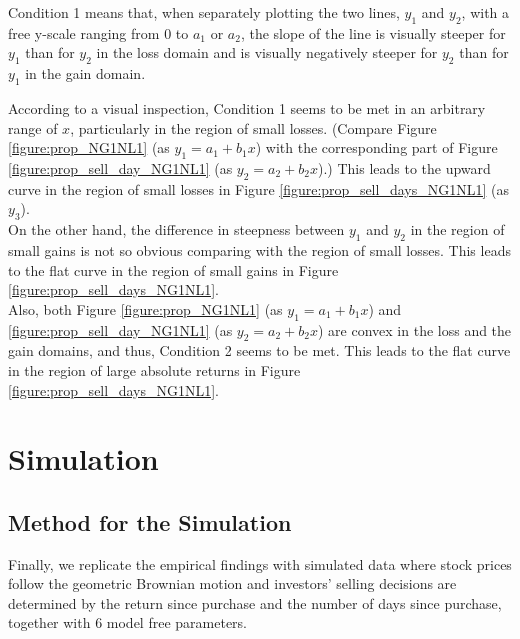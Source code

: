 \documentclass[11pt, a4paper]{article}
\begin{document}

Condition 1 means that, when separately plotting the two lines, $y_1$ and $y_2$, with a free y-scale ranging from 0 to $a_1$ or $a_2$, the slope of the line is visually steeper for $y_1$ than for $y_2$ in the loss domain and is visually negatively steeper for $y_2$ than for $y_1$ in the gain domain. 

\noindent
According to a visual inspection, Condition 1 seems to be met in an arbitrary range of $x$, particularly in the region of small losses. (Compare Figure \ref{figure:prop_NG1NL1} (as $y_1=a_1+b_1x$) with the corresponding part of Figure \ref{figure:prop_sell_day_NG1NL1} (as $y_2=a_2+b_2x$).) This leads to the upward curve in the region of small losses in Figure \ref{figure:prop_sell_days_NG1NL1} (as $y_3$).\\

\noindent
On the other hand, the difference in steepness between $y_1$ and $y_2$ in the region of small gains is not so obvious comparing with the region of small losses. This leads to the flat curve in the region of small gains in Figure \ref{figure:prop_sell_days_NG1NL1}.\\

\noindent
Also, both Figure \ref{figure:prop_NG1NL1} (as $y_1=a_1+b_1x$) and \ref{figure:prop_sell_day_NG1NL1} (as $y_2=a_2+b_2x$) are convex in the loss and the gain domains, and thus, Condition 2 seems to be met. This leads to the flat curve in the region of large absolute returns in Figure \ref{figure:prop_sell_days_NG1NL1}.\\


\section{Simulation}

\subsection{Method for the Simulation}
Finally, we replicate the empirical findings with simulated data where stock prices follow the geometric Brownian motion and investors' selling decisions are determined by the return since purchase and the number of days since purchase, together with 6 model free parameters.
\end{document}

